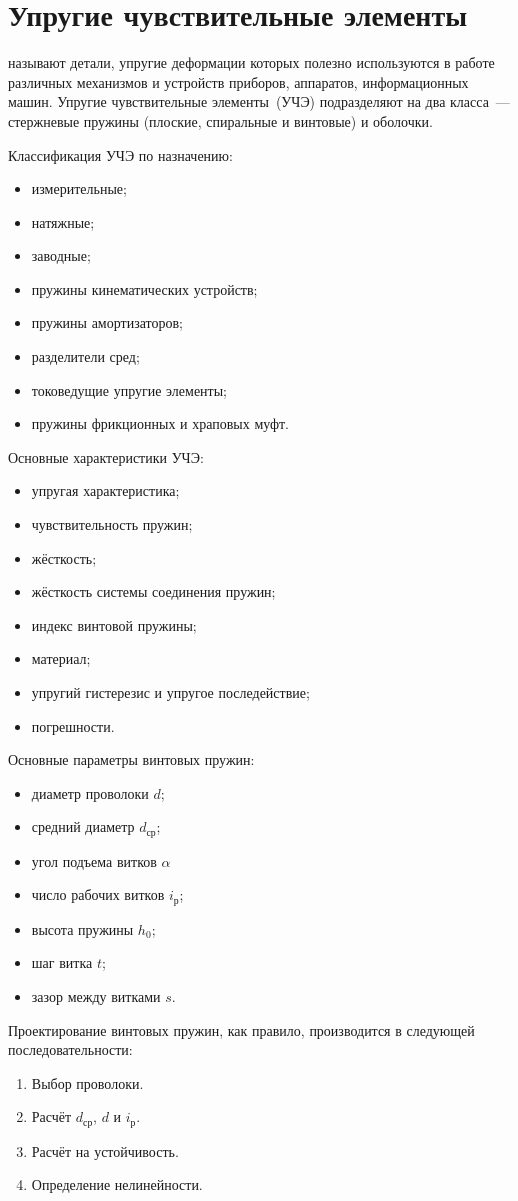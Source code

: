\chapter{Упругие чувствительные элементы}

 называют детали, упругие деформации которых полезно используются в работе различных механизмов и устройств приборов, аппаратов, информационных машин. 
Упругие чувствительные элементы~(УЧЭ) подразделяют на два класса~--- стержневые пружины (плоские, спиральные и винтовые) и оболочки.

Классификация УЧЭ по назначению:
\begin{itemize}
	\item измерительные;
	\item натяжные;
	\item заводные;
	\item пружины кинематических устройств;
	\item пружины амортизаторов;
	\item разделители сред;
	\item токоведущие упругие элементы;
	\item пружины фрикционных и храповых муфт.
\end{itemize}

Основные характеристики УЧЭ:
\begin{itemize}
	\item упругая характеристика;
	\item чувствительность пружин;
	\item жёсткость;
	\item жёсткость системы соединения пружин;
	\item индекс винтовой пружины;
	\item материал;
	\item упругий гистерезис и упругое последействие;
	\item погрешности.
\end{itemize}

Основные параметры винтовых пружин:
\begin{itemize}
	\item диаметр проволоки $ d $;
	\item средний диаметр $ d_\text{ср} $;
	\item угол подъема витков $ \alpha $
	\item число рабочих витков $ i_\text{р} $;
	\item высота пружины $ h_0 $;
	\item шаг витка $ t $;
	\item зазор между витками $ s $.
\end{itemize}

Проектирование винтовых пружин, как правило, производится в следующей последовательности:
\begin{enumerate}
	\item Выбор проволоки.
	\item Расчёт $ d_\text{ср} $, $ d $ и $ i_\text{р} $.
	\item Расчёт на устойчивость.
	\item Определение нелинейности.
\end{enumerate}